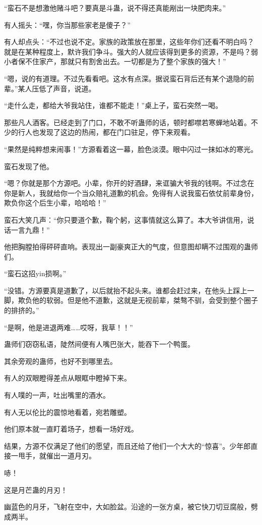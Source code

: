 \begin{this_body}
“蛮石不是想激他赌斗吧？要真是斗蛊，说不得还真能剐出一块肥肉来。”

有人摇头：“嘿，你当那些家老是傻子？”

有人却点头：“不过也说不定。家族的政策放在那里，这些年你们还看不明白吗？就是在某种程度上，默许我们争斗。强大的人就应该得到更多的资源，不是吗？弱小者保不住家产，那就只有割舍出去。一切都是为了整个家族的强大！”

“嗯，说的有道理。不过先看看吧。这水有点深。据说蛮石背后还有某个退隐的前辈。”某人压低了声音，说道。

“走什么走，都给大爷我站住，谁都不能走！”桌上子，蛮石突然一喝。

那些凡人酒客。已经走到了门口，不敢不听蛊师的话，顿时都噤若寒蝉地站着。不少的行人也发现了这边的热闹，都在门口驻足，停下来观看。

“果然是纯粹想来闹事！”方源看着这一幕，脸色淡漠。眼中闪过一抹如冰的寒光。

蛮石发现了他。

“嗯？你就是那个方源吧。小辈，你开的好酒肆，来诓骗大爷我的钱啊。不过念在你是新人，我就给你一个当众赔礼道歉的机会。免得有人说我蛮石依仗前辈身份，欺负你这个后生小辈，哈哈哈！”

蛮石大笑几声：“你只要道个歉，鞠个躬，这事情就这么算了。本大爷讲信用，说话一言九鼎！”

他把胸膛拍得砰砰直响。表现出一副豪爽正大的气度，但意图却瞒不过围观的蛊师们。

“蛮石这招yin损啊。”

“没错。方源要真是道歉了，以后就抬不起头来。谁都会赶过来，在他头上踩上一脚，欺负他的软弱。但是他不道歉，这就是无视前辈，桀骜不驯，会受到整个圈子的排挤的。”

“是啊，他是进退两难……哎呀，我草！！”

蛊师们窃窃私语，陡然间便有人嘴巴张大，能吞下一个鸭蛋。

其余旁观的蛊师，也好不到哪里去。

有人的双眼瞪得差点从眼眶中瞪掉下来。

有人噗的一声，吐出嘴里的酒水。

有人无以伦比的震惊地看着，宛若雕塑。

他们原本就一直盯着场子，想看一场好戏。

结果，方源不仅满足了他们的愿望，而且还给了他们一个大大的“惊喜”。少年郎直接一甩手，就催出一道月刃。

哧！

这是月芒蛊的月刃！

幽蓝色的月牙，飞射在空中，大如脸盆。沿途的一张方桌，被它快刀切豆腐般，劈成两半。


\end{this_body}
